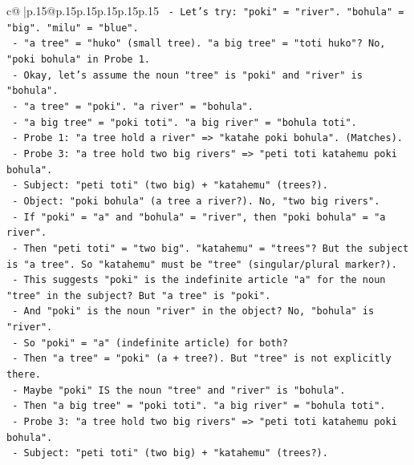 \documentclass{article}
\begin{document}
{\begin{supertabular}{c@{$\;$}|p{.15\linewidth}@{}p{.15\linewidth}p{.15\linewidth}p{.15\linewidth}p{.15\linewidth}p{.15\linewidth}}
{{{\texttt{            {-} Let's try: "poki" = "river". "bohula" = "big". "milu" = "blue".} \\
\texttt{            {-} "a tree" = "huko" (small tree). "a big tree" = "toti huko"? No, "poki bohula" in Probe 1.} \\
\texttt{            {-} Okay, let's assume the noun "tree" is "poki" and "river" is "bohula".} \\
\texttt{            {-} "a tree" = "poki". "a river" = "bohula".} \\
\texttt{            {-} "a big tree" = "poki toti". "a big river" = "bohula toti".} \\
\texttt{            {-} Probe 1: "a tree hold a river" => "katahe poki bohula". (Matches).} \\
\texttt{            {-} Probe 3: "a tree hold two big rivers" => "peti toti katahemu poki bohula".} \\
\texttt{              {-} Subject: "peti toti" (two big) + "katahemu" (trees?).} \\
\texttt{              {-} Object: "poki bohula" (a tree a river?). No, "two big rivers".} \\
\texttt{              {-} If "poki" = "a" and "bohula" = "river", then "poki bohula" = "a river".} \\
\texttt{              {-} Then "peti toti" = "two big". "katahemu" = "trees"? But the subject is "a tree". So "katahemu" must be "tree" (singular/plural marker?).} \\
\texttt{              {-} This suggests "poki" is the indefinite article "a" for the noun "tree" in the subject? But "a tree" is "poki".} \\
\texttt{              {-} And "poki" is the noun "river" in the object? No, "bohula" is "river".} \\
\texttt{              {-} So "poki" = "a" (indefinite article) for both?} \\
\texttt{              {-} Then "a tree" = "poki" (a + tree?). But "tree" is not explicitly there.} \\
\texttt{              {-} Maybe "poki" IS the noun "tree" and "river" is "bohula".} \\
\texttt{              {-} Then "a big tree" = "poki toti". "a big river" = "bohula toti".} \\
\texttt{              {-} Probe 3: "a tree hold two big rivers" => "peti toti katahemu poki bohula".} \\
\texttt{                {-} Subject: "peti toti" (two big) + "katahemu" (trees?).} \\
}}}
\end{supertabular}}
\end{document}
